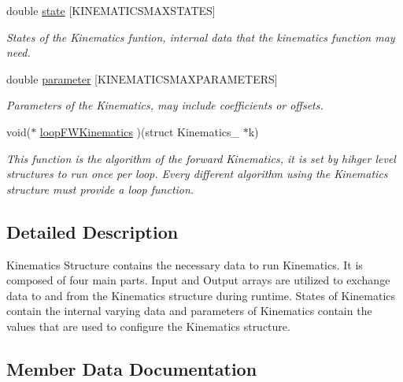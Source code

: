 \begin{DoxyCompactItemize}
\mbox{\label{struct_kinematcis___adc1185b4e9df5b8d45b3ab6a7a52c6fe}} 
double \hyperlink{struct_kinematcis___adc1185b4e9df5b8d45b3ab6a7a52c6fe}{state} \mbox{[}K\+I\+N\+E\+M\+A\+T\+I\+C\+S\+M\+A\+X\+S\+T\+A\+T\+ES\mbox{]}
\begin{DoxyCompactList}\small\item\em States of the Kinematics funtion, internal data that the kinematics function may need. \end{DoxyCompactList}\item 
\mbox{\label{struct_kinematcis___a556dfcb7cfd4c20b7f5345b4a9593dec}} 
double \hyperlink{struct_kinematcis___a556dfcb7cfd4c20b7f5345b4a9593dec}{parameter} \mbox{[}K\+I\+N\+E\+M\+A\+T\+I\+C\+S\+M\+A\+X\+P\+A\+R\+A\+M\+E\+T\+E\+RS\mbox{]}
\begin{DoxyCompactList}\small\item\em Parameters of the Kinematics, may include coefficients or offsets. \end{DoxyCompactList}\item 
void($\ast$ \hyperlink{struct_kinematcis___a28044bc9e9c97600e23158293c41aee7}{loop\+F\+W\+Kinematics} )(struct Kinematics\+\_\+ $\ast$k)
\begin{DoxyCompactList}\small\item\em This function is the algorithm of the forward Kinematics, it is set by hihger level structures to run once per loop. Every different algorithm using the Kinematics structure must provide a loop function. \end{DoxyCompactList}\end{DoxyCompactItemize}


\subsection{Detailed Description}
Kinematics Structure contains the necessary data to run Kinematics. It is composed of four main parts. Input and Output arrays are utilized to exchange data to and from the Kinematics structure during runtime. States of Kinematics contain the internal varying data and parameters of Kinematics contain the values that are used to configure the Kinematics structure. 

\subsection{Member Data Documentation}
\mbox{\label{struct_kinematcis___a28044bc9e9c97600e23158293c41aee7}} 
